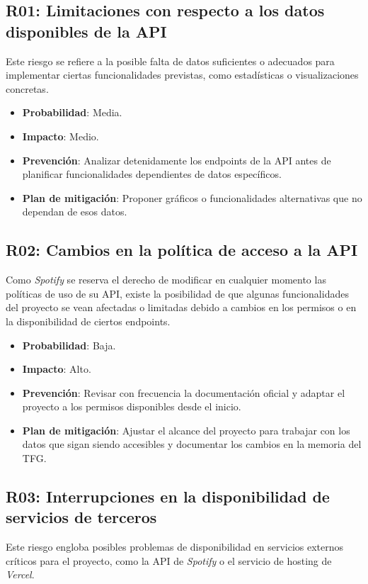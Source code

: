 \subsection*{R01: Limitaciones con respecto a los datos disponibles de la API}
Este riesgo se refiere a la posible falta de datos suficientes o adecuados para implementar ciertas funcionalidades previstas, como estadísticas o visualizaciones concretas.

\begin{itemize}
    \item \textbf{Probabilidad}: Media.
    \item \textbf{Impacto}: Medio.
    \item \textbf{Prevención}: Analizar detenidamente los endpoints de la API antes de planificar funcionalidades dependientes de datos específicos.
    \item \textbf{Plan de mitigación}: Proponer gráficos o funcionalidades alternativas que no dependan de esos datos.
\end{itemize}

\subsection*{R02: Cambios en la política de acceso a la API}
Como \textit{Spotify} se reserva el derecho de modificar en cualquier momento las políticas de uso de su API, existe la posibilidad de que algunas funcionalidades del proyecto se vean afectadas o limitadas debido a cambios en los permisos o en la disponibilidad de ciertos endpoints.

\begin{itemize}
    \item \textbf{Probabilidad}: Baja.
    \item \textbf{Impacto}: Alto.
    \item \textbf{Prevención}: Revisar con frecuencia la documentación oficial y adaptar el proyecto a los permisos disponibles desde el inicio.
    \item \textbf{Plan de mitigación}: Ajustar el alcance del proyecto para trabajar con los datos que sigan siendo accesibles y documentar los cambios en la memoria del TFG.
\end{itemize}

\subsection*{R03: Interrupciones en la disponibilidad de servicios de terceros}
Este riesgo engloba posibles problemas de disponibilidad en servicios externos críticos para el proyecto, como la API de \textit{Spotify} o el servicio de hosting de \textit{Vercel}.


